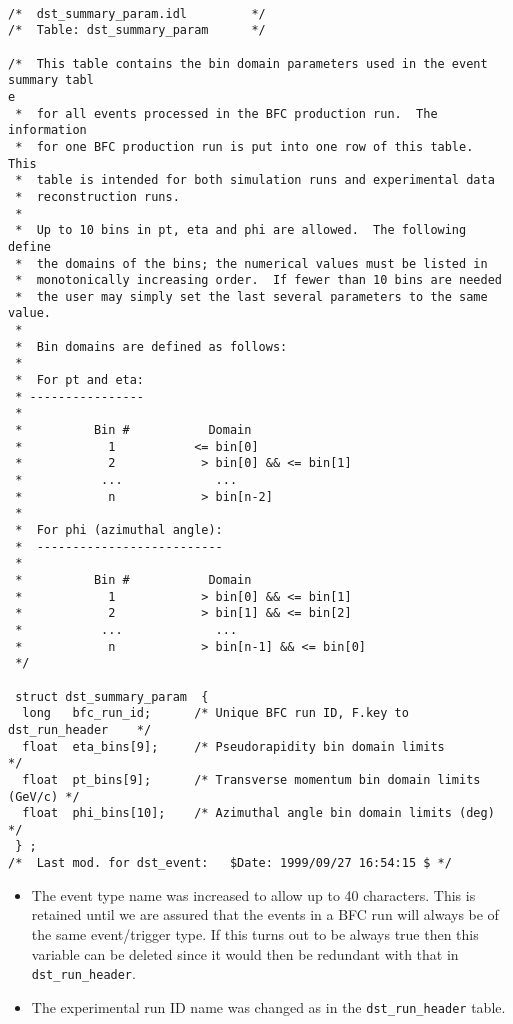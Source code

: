 \begin{verbatim}

/*  dst_summary_param.idl         */  
/*  Table: dst_summary_param      */  

/*  This table contains the bin domain parameters used in the event summary tabl
e
 *  for all events processed in the BFC production run.  The information
 *  for one BFC production run is put into one row of this table.  This
 *  table is intended for both simulation runs and experimental data
 *  reconstruction runs.
 *
 *  Up to 10 bins in pt, eta and phi are allowed.  The following define
 *  the domains of the bins; the numerical values must be listed in
 *  monotonically increasing order.  If fewer than 10 bins are needed
 *  the user may simply set the last several parameters to the same value.
 *
 *  Bin domains are defined as follows:
 *
 *  For pt and eta:
 * ----------------
 *
 *          Bin #           Domain
 *            1           <= bin[0]
 *            2            > bin[0] && <= bin[1]
 *           ...             ...
 *            n            > bin[n-2]
 *
 *  For phi (azimuthal angle):
 *  --------------------------
 *
 *          Bin #           Domain
 *            1            > bin[0] && <= bin[1]
 *            2            > bin[1] && <= bin[2]
 *           ...             ...
 *            n            > bin[n-1] && <= bin[0]
 */

 struct dst_summary_param  {
  long   bfc_run_id;      /* Unique BFC run ID, F.key to dst_run_header    */
  float  eta_bins[9];     /* Pseudorapidity bin domain limits              */
  float  pt_bins[9];      /* Transverse momentum bin domain limits (GeV/c) */
  float  phi_bins[10];    /* Azimuthal angle bin domain limits (deg)       */ 
 } ;
/*  Last mod. for dst_event:   $Date: 1999/09/27 16:54:15 $ */

\end{verbatim}

\vspace{0.1in}
\vspace{0.05in}

\begin{itemize}
\item
The event type name was increased to allow up to 40 characters.
This is retained until we are assured that the events in a BFC run
will always be of the same event/trigger type.  If this turns out to
be always true then this variable can be deleted since it would then
be redundant with that in {\tt dst\_run\_header}.
\item
The experimental run ID name was changed as in the {\tt dst\_run\_header}
table.
\end{itemize}

